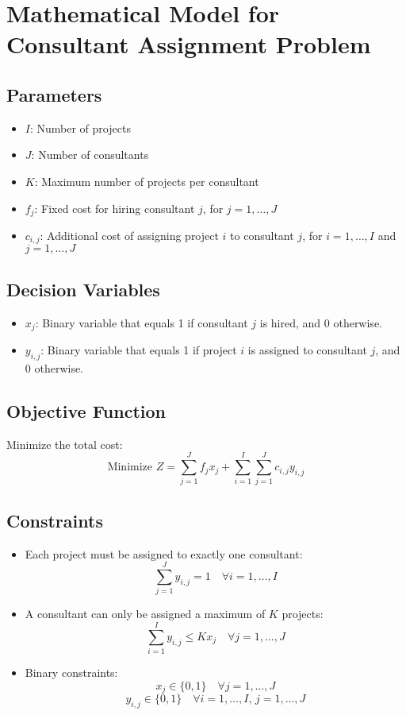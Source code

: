 \documentclass{article}
\begin{document}
\section*{Mathematical Model for Consultant Assignment Problem}

\subsection*{Parameters}
\begin{itemize}
    \item $I$: Number of projects
    \item $J$: Number of consultants
    \item $K$: Maximum number of projects per consultant
    \item $f_j$: Fixed cost for hiring consultant $j$, for $j = 1, \ldots, J$
    \item $c_{i,j}$: Additional cost of assigning project $i$ to consultant $j$, for $i = 1, \ldots, I$ and $j = 1, \ldots, J$
\end{itemize}

\subsection*{Decision Variables}
\begin{itemize}
    \item $x_{j}$: Binary variable that equals 1 if consultant $j$ is hired, and 0 otherwise.
    \item $y_{i,j}$: Binary variable that equals 1 if project $i$ is assigned to consultant $j$, and 0 otherwise.
\end{itemize}

\subsection*{Objective Function}
Minimize the total cost:
\[
\text{Minimize } Z = \sum_{j=1}^{J} f_j x_{j} + \sum_{i=1}^{I} \sum_{j=1}^{J} c_{i,j} y_{i,j}
\]

\subsection*{Constraints}
\begin{itemize}
    \item Each project must be assigned to exactly one consultant:
    \[
    \sum_{j=1}^{J} y_{i,j} = 1 \quad \forall i = 1, \ldots, I
    \]
    
    \item A consultant can only be assigned a maximum of $K$ projects:
    \[
    \sum_{i=1}^{I} y_{i,j} \leq K x_{j} \quad \forall j = 1, \ldots, J
    \]
    
    \item Binary constraints:
    \[
    x_{j} \in \{0, 1\} \quad \forall j = 1, \ldots, J
    \]
    \[
    y_{i,j} \in \{0, 1\} \quad \forall i = 1, \ldots, I, \, j = 1, \ldots, J
    \]
\end{itemize}
\end{document}
